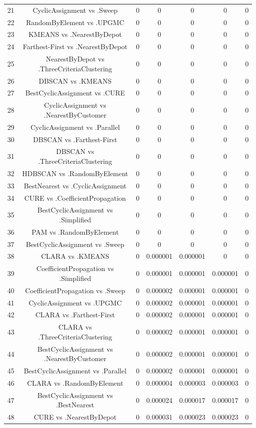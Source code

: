 \documentclass[a4paper,10pt]{article}
\begin{document}
\begin{landscape}
\begin{table}[!htp]
\begin{tabular}{ccccccc}
21&CyclicAssignment vs .Sweep&0&0&0&0&0\\
22&RandomByElement vs .UPGMC&0&0&0&0&0\\
23&KMEANS vs .NearestByDepot&0&0&0&0&0\\
24&Farthest-First vs .NearestByDepot&0&0&0&0&0\\
25&NearestByDepot vs .ThreeCriteriaClustering&0&0&0&0&0\\
26&DBSCAN vs .KMEANS&0&0&0&0&0\\
27&BestCyclicAssignment vs .CURE&0&0&0&0&0\\
28&CyclicAssignment vs .NearestByCustomer&0&0&0&0&0\\
29&CyclicAssignment vs .Parallel&0&0&0&0&0\\
30&DBSCAN vs .Farthest-First&0&0&0&0&0\\
31&DBSCAN vs .ThreeCriteriaClustering&0&0&0&0&0\\
32&HDBSCAN vs .RandomByElement&0&0&0&0&0\\
33&BestNearest vs .CyclicAssignment&0&0&0&0&0\\
34&CURE vs .CoefficientPropagation&0&0&0&0&0\\
35&BestCyclicAssignment vs .Simplified&0&0&0&0&0\\
36&PAM vs .RandomByElement&0&0&0&0&0\\
37&BestCyclicAssignment vs .Sweep&0&0&0&0&0\\
38&CLARA vs .KMEANS&0&0.000001&0.000001&0&0\\
39&CoefficientPropagation vs .Simplified&0&0.000001&0.000001&0.000001&0\\
40&CoefficientPropagation vs .Sweep&0&0.000002&0.000001&0.000001&0\\
41&CyclicAssignment vs .UPGMC&0&0.000002&0.000001&0.000001&0\\
42&CLARA vs .Farthest-First&0&0.000002&0.000001&0.000001&0\\
43&CLARA vs .ThreeCriteriaClustering&0&0.000002&0.000001&0.000001&0\\
44&BestCyclicAssignment vs .NearestByCustomer&0&0.000002&0.000001&0.000001&0\\
45&BestCyclicAssignment vs .Parallel&0&0.000002&0.000001&0.000001&0\\
46&CLARA vs .RandomByElement&0&0.000004&0.000003&0.000003&0\\
47&BestCyclicAssignment vs .BestNearest&0&0.000024&0.000017&0.000017&0\\
48&CURE vs .NearestByDepot&0&0.000031&0.000023&0.000023&0\\

\end{tabular}
\end{table}
\end{landscape}
\end{document}
